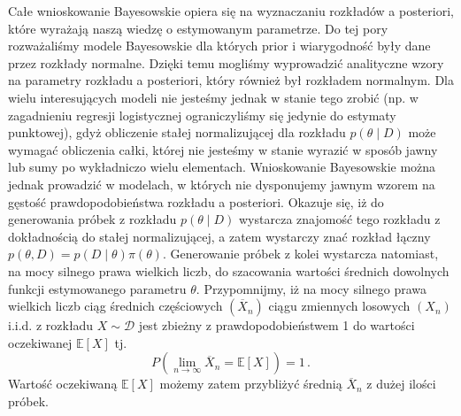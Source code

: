 \documentclass{myclass}
\begin{document}
Całe wnioskowanie Bayesowskie opiera się na wyznaczaniu rozkładów a posteriori, które wyrażają naszą
wiedzę o estymowanym parametrze. Do tej pory rozważaliśmy modele Bayesowskie dla których prior i
wiarygodność były dane przez rozkłady normalne. Dzięki temu mogliśmy wyprowadzić analityczne wzory
na parametry rozkładu a posteriori, który również był rozkładem normalnym. Dla wielu interesujących
modeli nie jesteśmy jednak w stanie tego zrobić (np. w zagadnieniu regresji logistycznej
ograniczyliśmy się jedynie do estymaty punktowej), gdyż obliczenie stałej normalizującej dla
rozkładu \(p(\theta \mid D)\) może wymagać obliczenia całki, której nie jesteśmy w stanie wyrazić w
sposób jawny lub sumy po wykładniczo wielu elementach. Wnioskowanie Bayesowskie można jednak
prowadzić w modelach, w których nie dysponujemy jawnym wzorem na gęstość prawdopodobieństwa rozkładu
a posteriori. Okazuje się, iż do generowania próbek z rozkładu \(p(\theta \mid D)\) wystarcza
znajomość tego rozkładu z dokładnością do stałej normalizującej, a zatem wystarczy znać rozkład
łączny \(p(\theta, D) = p(D\mid\theta)\pi(\theta)\). Generowanie próbek z kolei wystarcza natomiast,
na mocy silnego prawa wielkich liczb, do szacowania wartości średnich dowolnych funkcji estymowanego
parametru \(\theta\). Przypomnijmy, iż na mocy silnego prawa wielkich liczb ciąg średnich
częściowych \((\overline{X}_n)\) ciągu zmiennych losowych \((X_n)\) i.i.d. z rozkładu \(X \sim
\mathcal{D}\) jest zbieżny z prawdopodobieństwem 1 do wartości oczekiwanej \(\mathbb{E}[X]\) tj.
\begin{equation*}
    P\left(\lim_{n \to \infty} \overline{X}_n = \mathbb{E}[X]\right) = 1\,.
\end{equation*}
Wartość oczekiwaną \(\mathbb{E}[X]\) możemy zatem przybliżyć średnią \(\overline{X}_n\) z dużej
ilości próbek.
\end{document}

